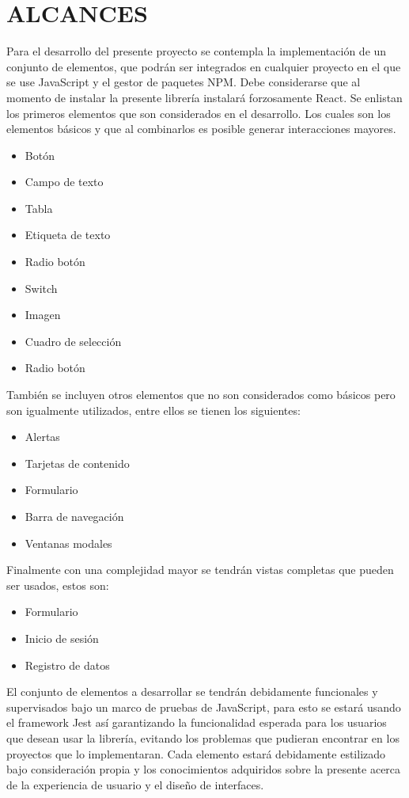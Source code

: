 \section{ALCANCES}

Para el desarrollo del presente proyecto se contempla la implementación de un conjunto de elementos, que podrán ser integrados en cualquier proyecto en el que se use JavaScript y el gestor de paquetes NPM. Debe considerarse que al momento de instalar la presente librería instalará forzosamente React.
 \newline
Se enlistan los primeros elementos que son considerados en el desarrollo. Los cuales son los elementos básicos y que al combinarlos es posible generar interacciones mayores.
 \newline
\begin{itemize}
\item Botón 
\item Campo de texto
\item Tabla
\item Etiqueta de texto
\item Radio botón
\item Switch
\item Imagen
\item Cuadro de selección
\item Radio botón 
\end{itemize}
 \newline
También se incluyen otros elementos que no son considerados como básicos pero son  igualmente utilizados, entre ellos se tienen los siguientes:
 \newline
 \begin{itemize}
\item  Alertas
\item Tarjetas de contenido
\item Formulario
\item Barra de navegación
\item Ventanas modales
\end{itemize}
\newline
 Finalmente con una complejidad mayor se tendrán vistas completas que pueden ser usados, estos son:
  \newline
 \begin{itemize}
\item  Formulario
\item Inicio de sesión
\item Registro de datos
\end{itemize}
\newline
El conjunto de elementos a desarrollar se tendrán debidamente funcionales y supervisados bajo un marco de pruebas de JavaScript, para esto se estará usando el framework Jest así garantizando la funcionalidad esperada para los usuarios que desean usar la librería, evitando los problemas que pudieran encontrar en los proyectos que lo implementaran. 
Cada elemento estará debidamente estilizado bajo consideración propia y los conocimientos adquiridos sobre la presente acerca de la experiencia de usuario y el diseño de interfaces.

